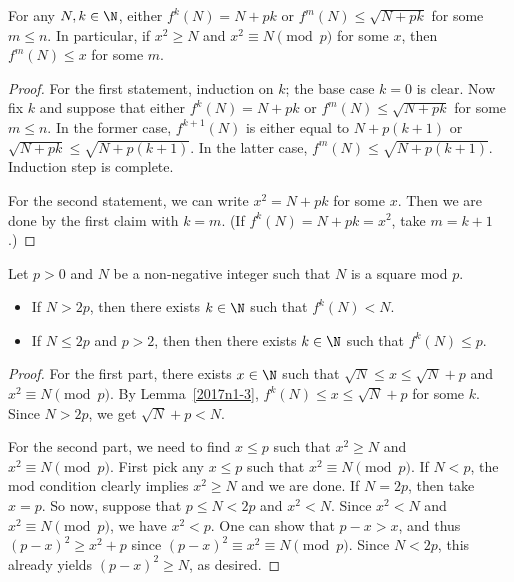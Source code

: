 \begin{lemma}\label{2017n1-3}
For any $N, k \in \N$, either $f^k(N) = N + pk$ or $f^m(N) \leq \sqrt{N + pk}$ for some $m \leq n$.
In particular, if $x^2 \geq N$ and $x^2 \equiv N \pmod{p}$ for some $x$, then $f^m(N) \leq x$ for some $m$.
\end{lemma}
\begin{proof}
For the first statement, induction on $k$; the base case $k = 0$ is clear.
Now fix $k$ and suppose that either $f^k(N) = N + pk$ or $f^m(N) \leq \sqrt{N + pk}$ for some $m \leq n$.
In the former case, $f^{k + 1}(N)$ is either equal to $N + p(k + 1)$ or $\sqrt{N + pk} \leq \sqrt{N + p(k + 1)}$.
In the latter case, $f^m(N) \leq \sqrt{N + p(k + 1)}$.
Induction step is complete.

For the second statement, we can write $x^2 = N + pk$ for some $x$.
Then we are done by the first claim with $k = m$.
(If $f^k(N) = N + pk = x^2$, take $m = k + 1$.)
\end{proof}

\begin{lemma}\label{2017n1-4}
Let $p > 0$ and $N$ be a non-negative integer such that $N$ is a square mod $p$.
\begin{itemize}
    \item   If $N > 2p$, then there exists $k \in \N$ such that $f^k(N) < N$.
    \item   If $N \leq 2p$ and $p > 2$, then then there exists $k \in \N$ such that $f^k(N) \leq p$.
\end{itemize}
\end{lemma}
\begin{proof}
For the first part, there exists $x \in \N$ such that $\sqrt{N} \leq x \leq \sqrt{N} + p$ and $x^2 \equiv N \pmod{p}$.
By Lemma~\ref{2017n1-3}, $f^k(N) \leq x \leq \sqrt{N} + p$ for some $k$.
Since $N > 2p$, we get $\sqrt{N} + p < N$.

For the second part, we need to find $x \leq p$ such that $x^2 \geq N$ and $x^2 \equiv N \pmod{p}$.
First pick any $x \leq p$ such that $x^2 \equiv N \pmod{p}$.
If $N < p$, the mod condition clearly implies $x^2 \geq N$ and we are done.
If $N = 2p$, then take $x = p$.
So now, suppose that $p \leq N < 2p$ and $x^2 < N$.
Since $x^2 < N$ and $x^2 \equiv N \pmod{p}$, we have $x^2 < p$.
One can show that $p - x > x$, and thus $(p - x)^2 \geq x^2 + p$ since $(p - x)^2 \equiv x^2 \equiv N \pmod{p}$.
Since $N < 2p$, this already yields $(p - x)^2 \geq N$, as desired.
\end{proof}

